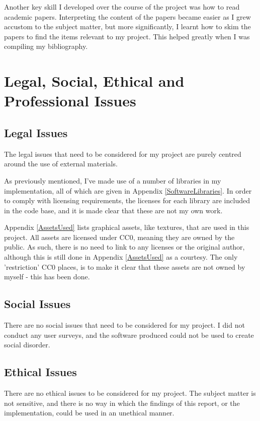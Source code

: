 \begin{appendices}
Another key skill I developed over the course of the project was how to read academic papers. Interpreting the content of the papers became easier as I grew accustom to the subject matter, but more significantly, I learnt how to skim the papers to find the items relevant to my project. This helped greatly when I was compiling my bibliography.

\section{Legal, Social, Ethical and Professional Issues}


\subsection{Legal Issues}

The legal issues that need to be considered for my project are purely centred around the use of external materials.

As previously mentioned, I've made use of a number of libraries in my implementation, all of which are given in Appendix \ref{SoftwareLibraries}. In order to comply with licensing requirements, the licenses for each library are included in the code base, and it is made clear that these are not my own work.

Appendix \ref{AssetsUsed} lists graphical assets, like textures, that are used in this project. All assets are licensed under CC0, meaning they are owned by the public. As such, there is no need to link to any licenses or the original author, although this is still done in Appendix \ref{AssetsUsed} as a courtesy. The only 'restriction' CC0 places, is to make it clear that these assets are not owned by myself - this has been done.

\subsection{Social Issues}

There are no social issues that need to be considered for my project. I did not conduct any user surveys, and the software produced could not be used to create social disorder.

\subsection{Ethical Issues}

There are no ethical issues to be considered for my project. The subject matter is not sensitive, and there is no way in which the findings of this report, or the implementation, could be used in an unethical manner.


\end{appendices}
